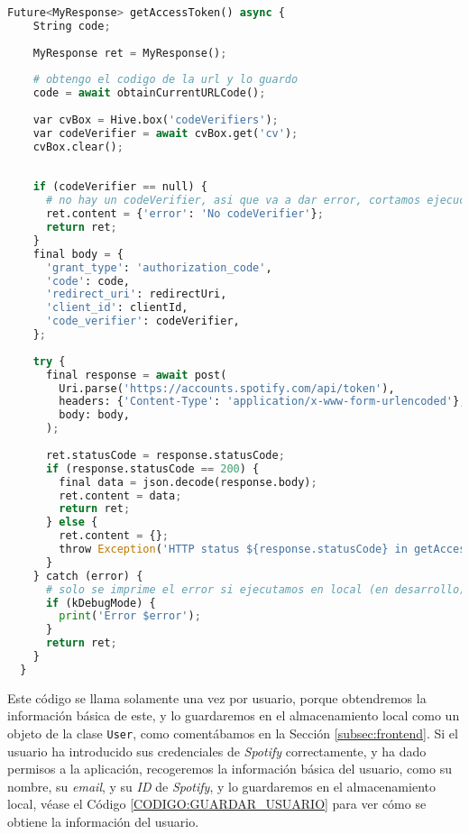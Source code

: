 \begin{lstlisting}[language=python, caption=Obtener \texttt{access\_token} y \texttt{refresh\_token}, label=CODIGO:GET_ACCESS_TOKEN]
  Future<MyResponse> getAccessToken() async {
    String code;
  
    MyResponse ret = MyResponse();
  
    # obtengo el codigo de la url y lo guardo
    code = await obtainCurrentURLCode();
  
    var cvBox = Hive.box('codeVerifiers');
    var codeVerifier = await cvBox.get('cv');
    cvBox.clear();
    
    
    if (codeVerifier == null) {
      # no hay un codeVerifier, asi que va a dar error, cortamos ejecucion
      ret.content = {'error': 'No codeVerifier'};
      return ret;
    }
    final body = {
      'grant_type': 'authorization_code',
      'code': code,
      'redirect_uri': redirectUri,
      'client_id': clientId,
      'code_verifier': codeVerifier,
    };
  
    try {
      final response = await post(
        Uri.parse('https://accounts.spotify.com/api/token'),
        headers: {'Content-Type': 'application/x-www-form-urlencoded'},
        body: body,
      );
  
      ret.statusCode = response.statusCode;
      if (response.statusCode == 200) {
        final data = json.decode(response.body);
        ret.content = data;
        return ret;
      } else {
        ret.content = {};
        throw Exception('HTTP status ${response.statusCode} in getAccessToken');
      }
    } catch (error) {
      # solo se imprime el error si ejecutamos en local (en desarrollo)
      if (kDebugMode) {
        print('Error $error');
      }
      return ret;
    }
  }

\end{lstlisting}

Este código se llama solamente una vez por usuario, porque obtendremos la información básica de este, y lo guardaremos
en el almacenamiento local como un objeto de la clase \texttt{User}, como comentábamos en la Sección \ref{subsec:frontend}.
Si el usuario ha introducido sus credenciales de \textit{Spotify} correctamente, y ha dado permisos a la aplicación, recogeremos
la información básica del usuario, como su nombre, su \textit{email}, y su \textit{ID} de \textit{Spotify}, y lo guardaremos en 
el almacenamiento local, véase el Código \ref{CODIGO:GUARDAR_USUARIO} para ver cómo se obtiene la información del usuario.

